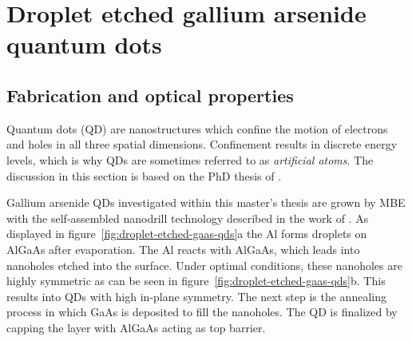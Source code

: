 \chapter{Droplet etched gallium arsenide quantum dots}
\label{chapter:quantum-dot}

\section{Fabrication and optical properties}

Quantum dots (\acs{QD}) are nanostructures which confine the motion of electrons and holes in all three spatial dimensions.
Confinement results in discrete energy levels, which is why \acp{QD} are sometimes referred to as \textit{artificial atoms}.
The discussion in this section is based on the PhD thesis of \textcite{huber_gaas_2019}.

Gallium arsenide \acp{QD} investigated within this master's thesis are grown by \ac{MBE} with the self-assembled nanodrill technology described in the work of \textcite{wang_nanoholes_2007}.
As displayed in figure~\ref{fig:droplet-etched-gaas-qds}a the Al forms droplets on AlGaAs after evaporation.
The Al reacts with AlGaAs, which leads into nanoholes etched into the surface.
Under optimal conditions, these nanoholes are highly symmetric as can be seen in figure~\ref{fig:droplet-etched-gaas-qds}b.
This results into \acp{QD} with high in-plane symmetry.
The next step is the annealing process in which GaAs is deposited to fill the nanoholes.
The \ac{QD} is finalized by capping the layer with AlGaAs acting as top barrier.

